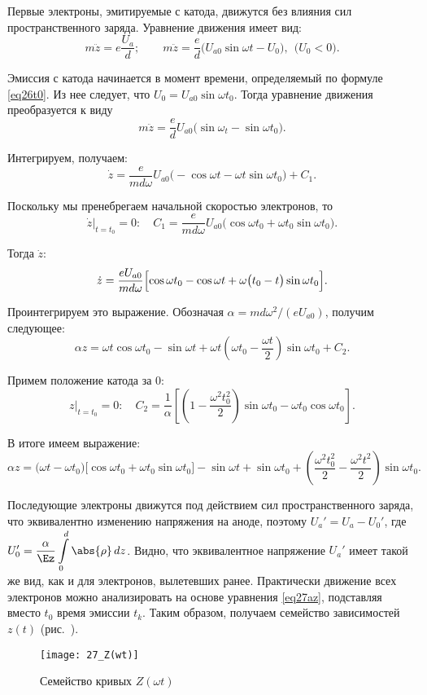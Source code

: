 
Первые электроны, эмитируемые с катода, движутся без влияния сил
пространственного заряда. Уравнение движения имеет вид:
\[
  m\ddot{z} = e\frac{U_a}{d}; \qquad
    m\ddot{z} = \frac{e}{d} \big( U_{a0}\sin\omega t - U_0 \big), \ \
    \big( U_0 < 0 \big).
\]

Эмиссия с катода начинается в момент времени, определяемый по формуле
\eqref{eq26t0}. Из нее следует, что \( U_0 = U_{a0}\sin\omega t_0 \). Тогда
уравнение движения преобразуется к виду
\[
  m\ddot{z} = \frac{e}{d}U_{a0} \bigl( \sin\omega_t - \sin\omega t_0 \big).
\]

Интегрируем, получаем:
\[
  \dot{z} = \frac{e}{md\omega}U_{a0} \big( -\cos\omega t -
    \omega t\sin\omega t_0 \big) + C_1.
\]

Поскольку мы пренебрегаем начальной скоростью электронов, то
\[
  \dot{z}\Big|_{t = t_0} = 0\colon \quad
    C_1 = \frac{e}{md\omega}U_{a0} \bigl(\cos\omega t_0 +
    \omega t_0\sin\omega t_0\big).
\]

Тогда \( \dot{z} \):
\[
  \dot{z} = \frac{eU_{a0}}{md\omega}\Bigl[ \cos\omega t_0 - \cos\omega t +
    \omega \big( t_0 - t \big) \sin\omega t_0 \Big].
\]

Проинтегрируем это выражение. Обозначая \( \alpha = md\omega^2 / (eU_{a0}) \),
получим следующее:
\[
  \alpha z = \omega t\cos\omega t_0 - \sin\omega t + \omega t \left( \omega t_0
    - \frac{\omega t}{2} \right) \sin\omega t_0 + C_2.
\]

Примем положение катода за 0:
\[
  z\Big|_{t = t_0} = 0\colon \quad
    C_2 = \frac{1}{\alpha} \left[ \left( 1 - \frac{\omega^2 t_0^2}{2} \right)
    \sin\omega t_0 - \omega t_0 \cos\omega t_0 \right].
\]

В итоге имеем выражение:
\begin{equation}
  \alpha z = \bigl( \omega t - \omega t_0 \big)\bigl[ \cos\omega t_0 +
    \omega t_0 \sin\omega t_0 \big] - \sin\omega t + \sin\omega t_0 + \left(
    \frac{\omega^2 t_0^2}{2} - \frac{\omega^2 t^2}{2} \right) \sin\omega t_0.
  \label{eq27az}
\end{equation}

Последующие электроны движутся под действием сил пространственного заряда, что
эквивалентно изменению напряжения на аноде, поэтому \( U_a' = U_a - U_0' \), где
\( \displaystyle
  U_0' = \frac{\alpha}{\Ez} \int\limits_0^d \abs{\rho}\,dz
\).
Видно, что эквивалентное напряжение \( U_a' \) имеет такой же вид, как и для
электронов, вылетевших ранее. Практически движение всех электронов можно
анализировать на основе уравнения \eqref{eq27az}, подставляя вместо \( t_0 \)
время эмиссии \( t_k \). Таким образом, получаем семейство зависимостей
\( z(t) \) (рис.~\pic{27Z(wt)}).
\begin{figure}[h!]
  \center
  \texttt{[image: 27\_Z(wt)]} \\
  \caption{Семейство кривых \( Z(\omega t) \)}
  \label{pic27Z(wt)}
\end{figure}

